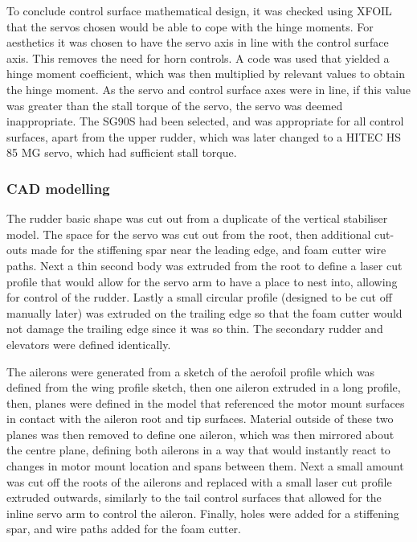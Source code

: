 \documentclass[../../main.tex]{subfiles}
\begin{document}
To conclude control surface mathematical design, it was checked using XFOIL that the servos chosen would be able to cope with the hinge moments.
For aesthetics it was chosen to have the servo axis in line with the control surface axis.
This removes the need for horn controls.
A code was used that yielded a hinge moment coefficient, which was then multiplied by relevant values to obtain the hinge moment.
As the servo and control surface axes were in line, if this value was greater than the stall torque of the servo, the servo was deemed inappropriate.
The SG90S had been selected, and was appropriate for all control surfaces, apart from the upper rudder, which was later changed to a HITEC HS 85 MG servo, which had sufficient stall torque. 

\subsubsection{CAD modelling} \label{sec:design-process:final-design-proposal:control-surfaces:cad-modelling}


The rudder basic shape was cut out from a duplicate of the vertical stabiliser model.
The space for the servo was cut out from the root, then additional cut-outs made for the stiffening spar near the leading edge, and foam cutter wire paths.
Next a thin second body was extruded from the root to define a laser cut profile that would allow for the servo arm to have a place to nest into, allowing for control of the rudder.
Lastly a small circular profile (designed to be cut off manually later) was extruded on the trailing edge so that the foam cutter would not damage the trailing edge since it was so thin.
The secondary rudder and elevators were defined identically. 

The ailerons were generated from a sketch of the aerofoil profile which was defined from the wing profile sketch, then one aileron extruded in a long profile, then, planes were defined in the model that referenced the motor mount surfaces in contact with the aileron root and tip surfaces.
Material outside of these two planes was then removed to define one aileron, which was then mirrored about the centre plane, defining both ailerons in a way that would instantly react to changes in motor mount location and spans between them.
Next a small amount was cut off the roots of the ailerons and replaced with a small laser cut profile extruded outwards, similarly to the tail control surfaces that allowed for the inline servo arm to control the aileron.
Finally, holes were added for a stiffening spar, and wire paths added for the foam cutter. 
\end{document}
